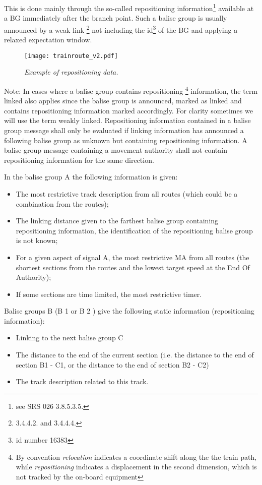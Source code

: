 This is done mainly through the so-called repositioning information\footnote{see \gls{SRS} 026 3.8.5.3.5.} available at a BG immediately after the branch point. Such a balise group is usually announced by a weak link \footnote{3.4.4.2. and 3.4.4.4.} not including the id\footnote{id number 16383 } of the BG and applying a relaxed expectation window.
\begin{figure}[!ht]
\centerline{
\texttt{[image: trainroute\_v2.pdf]}
}
\caption{\emph{Example of repositioning data.}}
\label {fig:Fig24}
\end{figure}
Note: In cases where a balise group contains repositioning \footnote{By convention \emph{relocation} indicates a coordinate shift along the the train path, while \emph{repositioning} indicates a displacement in the second dimension, which is not tracked by the on-board equipment} information, the term linked also applies since the balise group is announced, marked as linked and contains repositioning information marked accordingly. For clarity sometimes we will use the term weakly linked. Repositioning information contained in a balise group message shall only be evaluated if linking information has announced a following balise group as unknown but containing repositioning information. A balise group message containing a movement authority shall not contain repositioning information for the same direction.

In the balise group A the following information is given:
\begin{itemize}
\item The most restrictive track description from all routes (which could be a combination
from the routes);
\item The linking distance given to the farthest balise group containing repositioning
information, the identification of the repositioning balise group is not known;
\item For a given aspect of signal A, the most restrictive MA from all routes (the shortest
sections from the routes and the lowest target speed at the End Of Authority);
\item If some sections are time limited, the most restrictive timer.
\end{itemize}
Balise groups B (B 1 or B 2 ) give the following static information (repositioning information):
\begin{itemize}
\item Linking to the next balise group C
\item The distance to the end of the current section (i.e. the distance to the end of section
B1 - C1, or the distance to the end of section B2 - C2)
\item The track description related to this track.

\end{itemize}

